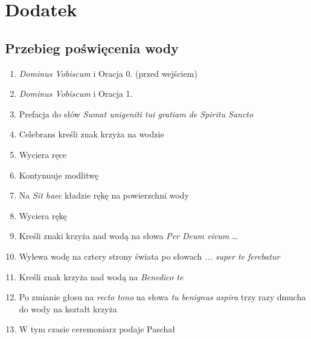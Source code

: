 \section{Dodatek}

\subsection{Przebieg poświęcenia wody}
\label{sec:woda}
\begin{enumerate}
      \item \textit{Dominus Vobiscum} i Oracja 0. (przed wejściem)
      \item \textit{Dominus Vobiscum} i Oracja 1. 
      \item Prefacja do słów \textit{Sumat unigeniti tui gratiam de Spiritu
                  Sancto}
      \item Celebrans kreśli znak krzyża
            \textcolor{red}{} na
            wodzie
      \item Wyciera ręce
      \item Kontynuuje modlitwę
      \item Na \textit{Sit haec} kładzie rękę na powierzchni wody
      \item Wyciera rękę
      \item Kreśli znaki krzyża
            \textcolor{red}{}
            nad wodą na słowa \textit{Per Deum vivum \dots}
            \vspace*{-11pt}
      \item Wylewa wodę na cztery strony świata po słowach \textit{... super te
                  ferebatur} ~~~
            \vspace*{-7pt}
      \item Kreśli znak krzyża nad wodą na \textit{Benedico te}
      \item Po zmianie głosu na \textit{recto tono} na słowa \textit{tu benignus
                  aspira} trzy razy dmucha do wody na kształt krzyża
      \item W tym czasie ceremoniarz podaje Paschał

\end{enumerate}
